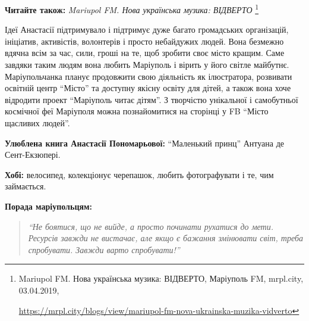 \textbf{Читайте також:} \emph{Mariupol FM. Нова українська музика: ВІДВЕРТО}%
\footnote{Mariupol FM. Нова українська музика: ВІДВЕРТО, Маріуполь FM, mrpl.city, 03.04.2019, \par%
\url{https://mrpl.city/blogs/view/mariupol-fm-nova-ukrainska-muzika-vidverto}
}


Ідеї Анастасії підтримувало і підтримує дуже багато громадських організацій,
ініціатив, активістів, волонтерів і просто небайдужих людей. Вона безмежно
вдячна всім за час, сили, гроші на те, щоб зробити своє місто кращим. Саме
завдяки таким людям вона любить Маріуполь і вірить у його світле майбутнє.
Маріупольчанка планує продовжити свою діяльність як ілюстратора, розвивати
освітній центр \enquote{Місто} та доступну якісну освіту для дітей, а також вона хоче
відродити проект \enquote{Маріуполь читає дітям}. З творчістю унікальної і самобутньої
космічної феї Маріуполя можна познайомитися на сторінці у FB \enquote{Місто щасливих
людей}.

\textbf{Улюблена книга Анастасії Пономарьової:} \enquote{Маленький принц} Антуана де Сент-Екзюпері.

\textbf{Хобі:} велосипед, колекціонує черепашок, любить фотографувати і те, чим займається.

\textbf{Порада маріупольцям:} 

\begin{quote}
\em\enquote{Не боятися, що не вийде, а просто починати рухатися до мети. Ресурсів завжди
не вистачає, але якщо є бажання змінювати світ, треба спробувати. Завжди варто
спробувати!}
\end{quote}


